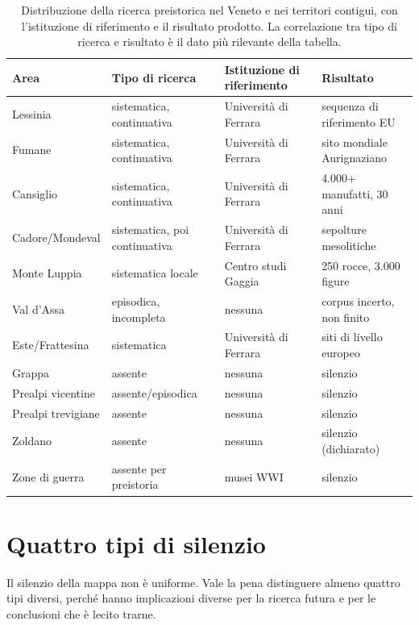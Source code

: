 \begin{table}[htbp]
\centering
\small
\begin{tabular}{@{}p{3.2cm}p{2.2cm}p{2.8cm}p{2.2cm}@{}}
\toprule
\textbf{Area} & \textbf{Tipo di ricerca} & \textbf{Istituzione di riferimento} & \textbf{Risultato} \\
\midrule
Lessinia & sistematica, continuativa & Università di Ferrara & sequenza di riferimento EU \\
Fumane & sistematica, continuativa & Università di Ferrara & sito mondiale Aurignaziano \\
Cansiglio & sistematica, continuativa & Università di Ferrara & 4.000+ manufatti, 30 anni \\
Cadore/Mondeval & sistematica, poi continuativa & Università di Ferrara & sepolture mesolitiche \\
Monte Luppia & sistematica locale & Centro studi Gaggia & 250 rocce, 3.000 figure \\
Val d'Assa & episodica, incompleta & nessuna & corpus incerto, non finito \\
Este/Frattesina & sistematica & Università di Ferrara & siti di livello europeo \\
Grappa & assente & nessuna & silenzio \\
Prealpi vicentine & assente/episodica & nessuna & silenzio \\
Prealpi trevigiane & assente & nessuna & silenzio \\
Zoldano & assente & nessuna & silenzio (dichiarato) \\
Zone di guerra & assente per preistoria & musei WWI & silenzio \\
\bottomrule
\end{tabular}
\caption{Distribuzione della ricerca preistorica nel Veneto e nei territori contigui, con l'istituzione di riferimento e il risultato prodotto. La correlazione tra tipo di ricerca e risultato è il dato più rilevante della tabella.}
\label{tab:mappa_ricerca}
\end{table}

\section{Quattro tipi di silenzio}

Il silenzio della mappa non è uniforme. Vale la pena distinguere almeno quattro tipi diversi, perché hanno implicazioni diverse per la ricerca futura e per le conclusioni che è lecito trarne.

